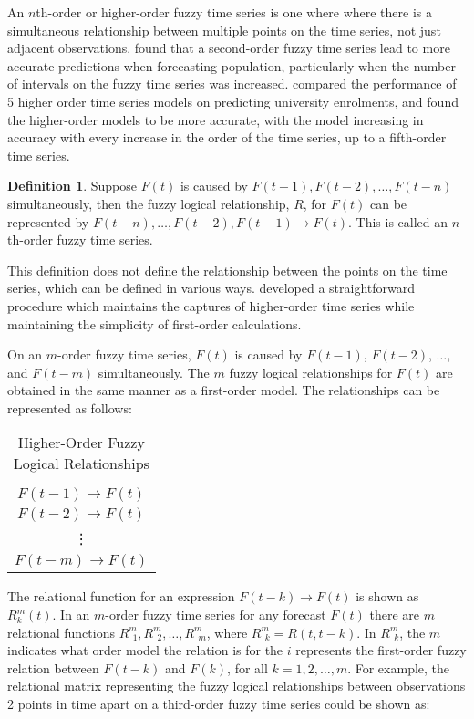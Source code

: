 \documentclass{article}
\theoremstyle{definition}
\newtheorem{ftsdef}{Definition}
\begin{document}
An $n$th-order or higher-order fuzzy time series is one where where there is a simultaneous relationship between multiple points on the time series, not just adjacent observations. \cite{tsai1999study} found that a second-order fuzzy time series lead to more accurate predictions when forecasting population, particularly when the number of intervals on the fuzzy time series was increased. \cite{chen2002forecasting} compared the performance of 5 higher order time series models on predicting university enrolments, and found the higher-order models to be more accurate, with the model increasing in accuracy with every increase in the order of the time series, up to a fifth-order time series.

\begin{ftsdef}
Suppose $F(t)$ is caused by $F(t-1),F(t-2),\ldots,F(t-n)$ simultaneously, then the fuzzy logical relationship, $R$, for $F(t)$ can be represented by $F(t-n),\ldots, F(t-2),F(t-1) \rightarrow F(t)$. This is called an $n$th-order fuzzy time series.
\end{ftsdef}

This definition does not define the relationship between the points on the time series, which can be defined in various ways. \cite{tsai1999study} developed a straightforward procedure which maintains the captures of higher-order time series while maintaining the simplicity of first-order calculations.

On an $m$-order fuzzy time series, $F(t)$ is caused by $F(t-1)$, $F(t-2)$, $\ldots$, and $F(t-m)$ simultaneously. The $m$ fuzzy logical relationships for $F(t)$ are obtained in the same manner as a first-order model. The relationships can be represented as follows:

\begin{table}[H]
	\center
	\begin{tabular}{ c }
  	$F(t-1) \rightarrow F(t)$ \\
  	$F(t-2) \rightarrow F(t)$ \\
  	\vdots \\
  	$F(t-m) \rightarrow F(t)$ \\
	\end{tabular}
	\caption{Higher-Order Fuzzy Logical Relationships}
\end{table}

The relational function for an expression $F(t-k) \rightarrow F(t)$ is shown as $R^{m}_{k}(t)$. In an $m$-order fuzzy time series for any forecast $F(t)$ there are $m$ relational functions $R^{m}_{\ \ 1}, R^{m}_{\ \ 2}, \ldots, R^{m}_{\ \ m}$, where $R^{m}_{\ \ k}=R(t,t-k)$. In $R^{m}_{\ \ k}$, the $m$ indicates what order model the relation is for the $i$ represents the first-order fuzzy relation between $F(t-k)$ and $F(k)$, for all $k={1,2,\ldots,m}$. For example, the relational matrix representing the fuzzy logical relationships between observations 2 points in time apart on a third-order fuzzy time series could be shown as:
\end{document}
